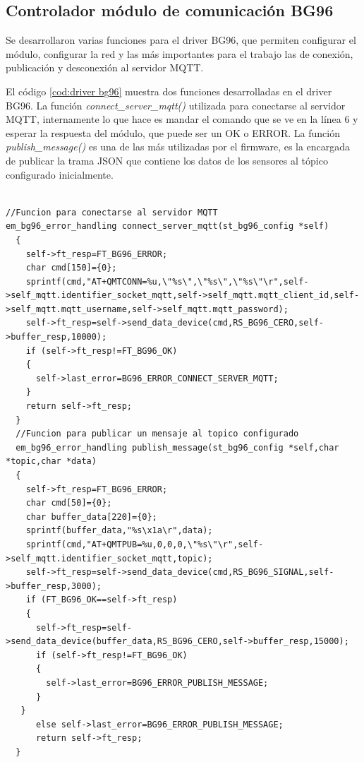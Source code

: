 \subsection{ Controlador módulo de comunicación BG96 } 
Se desarrollaron varias funciones para el driver BG96, que permiten configurar el módulo, configurar la red y las más importantes para el trabajo las de conexión, publicación y desconexión al servidor MQTT.

El código \ref{cod:driver bg96} muestra dos funciones desarrolladas en el driver BG96. La función \emph{connect\_server\_mqtt()} utilizada para conectarse al servidor MQTT, internamente lo que hace es mandar el comando que se ve en la línea 6 y esperar la respuesta del módulo, que puede ser un OK o ERROR. La función \emph{publish\_message()} es una de las más utilizadas por el firmware, es la encargada de publicar la trama JSON que contiene los datos de los sensores al tópico configurado inicialmente. 
\begin{lstlisting}[label=cod:driver bg96,caption=Función de conexión y publicación al broker MQTT.]  % Start your code-block

//Funcion para conectarse al servidor MQTT
em_bg96_error_handling connect_server_mqtt(st_bg96_config *self)
  {
    self->ft_resp=FT_BG96_ERROR;
    char cmd[150]={0};
    sprintf(cmd,"AT+QMTCONN=%u,\"%s\",\"%s\",\"%s\"\r",self->self_mqtt.identifier_socket_mqtt,self->self_mqtt.mqtt_client_id,self->self_mqtt.mqtt_username,self->self_mqtt.mqtt_password);
    self->ft_resp=self->send_data_device(cmd,RS_BG96_CERO,self->buffer_resp,10000);
    if (self->ft_resp!=FT_BG96_OK)
    {
      self->last_error=BG96_ERROR_CONNECT_SERVER_MQTT;
    }
    return self->ft_resp;
  }
  //Funcion para publicar un mensaje al topico configurado 
  em_bg96_error_handling publish_message(st_bg96_config *self,char *topic,char *data)
  {
    self->ft_resp=FT_BG96_ERROR;
    char cmd[50]={0};
    char buffer_data[220]={0};
    sprintf(buffer_data,"%s\x1a\r",data);
    sprintf(cmd,"AT+QMTPUB=%u,0,0,0,\"%s\"\r",self->self_mqtt.identifier_socket_mqtt,topic);
    self->ft_resp=self->send_data_device(cmd,RS_BG96_SIGNAL,self->buffer_resp,3000);
    if (FT_BG96_OK==self->ft_resp)
    {
      self->ft_resp=self->send_data_device(buffer_data,RS_BG96_CERO,self->buffer_resp,15000);
      if (self->ft_resp!=FT_BG96_OK)
      {
        self->last_error=BG96_ERROR_PUBLISH_MESSAGE;
      }   
   }
      else self->last_error=BG96_ERROR_PUBLISH_MESSAGE;
      return self->ft_resp;
  }
\end{lstlisting}



